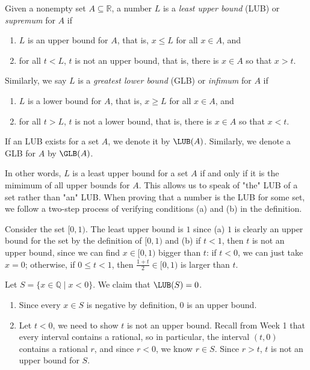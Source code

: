 \documentclass[11pt,dvipsnames]{book}
\numberwithin{figure}{section} %
\numberwithin{table}{section} %
\begin{document}
\begin{definition}
Given a nonempty set $A\subseteq \mathbb{R}$, a number $L$ is a {\it least upper bound} (LUB) or {\it supremum} for $A$ if
\begin{enumerate}[label=(\alph*)]
\item $L$ is an upper bound for $A$, that is, $x\leq L$ for all $x\in A$, and
\item for all $t<L$, $t$ is not an upper bound, that is, there is $x\in A$ so that $x>t$.
\end{enumerate}
Similarly, we say $L$ is a {\it greatest lower bound} (GLB) or {\it infimum} for $A$ if
\begin{enumerate}[label=(\alph*)]
\item $L$ is a lower bound for $A$, that is, $x\geq L$ for all $x\in A$, and
\item for all $t>L$, $t$ is not a lower bound, that is, there is $x\in A$ so that $x<t$.
\end{enumerate}
If an LUB exists for a set $A$, we denote it by $\LUB(A)$. Similarly, we denote a GLB for $A$ by $\GLB(A)$.
\end{definition}

In other words, $L$ is a least upper bound for a set $A$ if and only if it is the mimimum of all upper bounds for $A$. This allows us to speak of "the" LUB of a set rather than "an" LUB. When proving that a number is the LUB for some set, we follow a two-step process of verifying conditions (a) and (b) in the definition.

\begin{example}
Consider the set $[0,1)$. The least upper bound is $1$ since (a) $1$ is clearly an upper bound for the set by the definition of $[0,1)$ and (b) if $t<1$, then $t$ is not an upper bound, since we can find $x\in [0,1)$ bigger than $t$: if $t<0$, we can just take $x=0$; otherwise, if $0\leq t<1$, then $\frac{1+t}{2}\in [0,1)$ is larger than $t$.
\end{example}

\begin{example}
Let $S=\{x\in\mathbb{Q} \; | \; x<0\}$. We claim that $\LUB(S)=0$.

\begin{enumerate}[label=(\alph*)]
\item Since every $x\in S$ is negative by definition, $0$ is an upper bound.
\item Let $t<0$, we need to show $t$ is not an upper bound. Recall from Week 1 that every interval contains a rational, so in particular, the interval $(t,0)$ contains a rational $r$, and since $r<0$, we know $r\in S$. Since $r>t$, $t$ is not an upper bound for $S$.
\end{enumerate}
\end{example}
\end{document}
